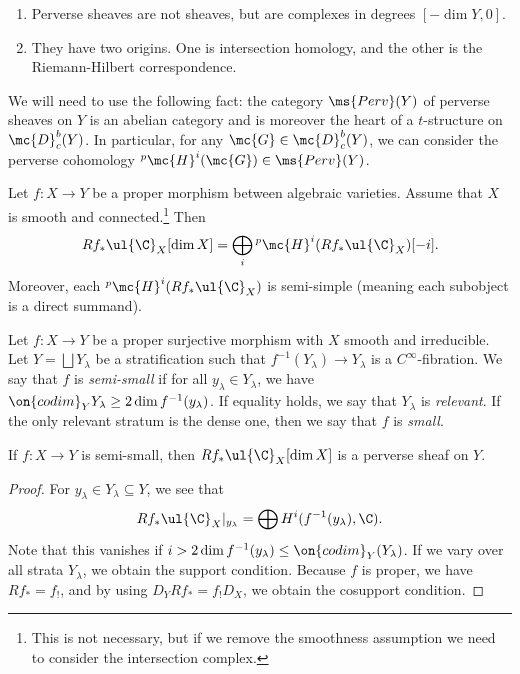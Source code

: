\begin{rmks}\leavevmode
    \begin{enumerate}
        \item Perverse sheaves are not sheaves, but are complexes in degrees \([-\dim Y, 0]\).
        \item They have two origins. One is intersection homology, and the other is the Riemann-Hilbert correspondence.
    \end{enumerate}
\end{rmks}

We will need to use the following fact: the category \(\ms{Perv}(Y)\) of perverse sheaves on \(Y\) is an abelian category and is moreover the heart of a \(t\)-structure on \(\mc{D}_c^b(Y)\). In particular, for any \(\mc{G} \in \mc{D}_c^b (Y)\), we can consider the perverse cohomology \(^p\mc{H}^i(\mc{G}) \in \ms{Perv}(Y)\).

\begin{thm}
    Let \(f \colon X \to Y\) be a proper morphism between algebraic varieties. Assume that \(X\) is smooth and connected.\footnote{This is not necessary, but if we remove the smoothness assumption we need to consider the intersection complex.} Then
    \[ R f_* \ul{\C}_X [\dim X] = \bigoplus_{i} {^p\mc{H}^i}(R f_* \ul{\C}_X)[-i]. \]
    Moreover, each \(^p\mc{H}^i (R f_* \ul{\C}_X)\) is semi-simple (meaning each subobject is a direct summand).
\end{thm}

\begin{defn}
    Let \(f \colon X \to Y\) be a proper surjective morphism with \(X\) smooth and irreducible. Let \(Y = \bigsqcup Y_{\lambda}\) be a stratification such that \(f^{-1}(Y_{\lambda}) \to Y_{\lambda}\) is a \(C^{\infty}\)-fibration. We say that \(f\) is \textit{semi-small} if for all \(y_{\lambda} \in Y_{\lambda}\), we have \(\on{codim}_Y Y_{\lambda} \geq 2 \dim f^{-1} (y_{\lambda})\). If equality holds, we say that \(Y_{\lambda}\) is \textit{relevant}. If the only relevant stratum is the dense one, then we say that \(f\) is \textit{small}.
\end{defn}

\begin{thm}
    If \(f \colon X \to Y\) is semi-small, then \(R f_* \ul{\C}_X [\dim X]\) is a perverse sheaf on \(Y\).
\end{thm}

\begin{proof}
    For \(y_{\lambda} \in Y_{\lambda} \subseteq Y\), we see that
    \[ R f_* \ul{\C}_X |_{y_{\lambda}} = \bigoplus H^i (f^{-1}(y_{\lambda}), \C). \]
    Note that this vanishes if \(i > 2 \dim f^{-1}(y_{\lambda}) \leq \on{codim}_Y (Y_{\lambda})\). If we vary over all strata \(Y_{\lambda}\), we obtain the support condition. Because \(f\) is proper, we have \(R f_* = f_!\), and by using \(D_Y R f_* = f_! D_X\), we obtain the cosupport condition.
\end{proof}

